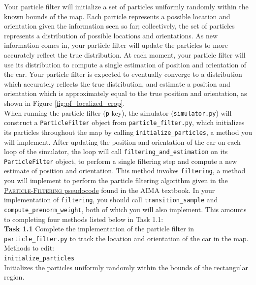 \documentclass[a4paper]{article}
\theoremstyle{definition}
\theoremstyle{plain}
\begin{document}
Your particle filter will initialize a set of particles uniformly randomly within the known bounds of the map. Each particle represents a possible location and orientation given the information seen so far; collectively, the set of particles represents a distribution of possible locations and orientations. As new information comes in, your particle filter will update the particles to more accurately reflect the true distribution. At each moment, your particle filter will use its distribution to compute a single estimation of position and orientation of the car. Your particle filter is expected to eventually converge to a distribution which accurately reflects the true distribution, and estimate a position and orientation which is approximately equal to the true position and orientation, as shown in Figure \ref{fig:pf_localized_crop}.\\

When running the particle filter (\texttt{p} key), the simulator (\texttt{simulator.py}) will construct a \texttt{ParticleFilter} object from \texttt{particle\_filter.py}, which initializes its particles throughout the map by calling \texttt{initialize\_particles}, a method you will implement. After updating the position and orientation of the car on each loop of the simulator, the loop will call \texttt{filtering\_and\_estimation} on its \texttt{ParticleFilter} object, to perform a single filtering step and compute a new estimate of position and orientation. This method invokes \texttt{filtering}, a method you will implement to perform the particle filtering algorithm given in the \href{https://github.com/aimacode/aima-pseudocode/blob/master/md/Particle-Filtering.md}{\textsc{Particle-Filtering} pseudocode} found in the AIMA textbook. In your implementation of \texttt{filtering}, you should call \texttt{transition\_sample} and \texttt{compute\_prenorm\_weight}, both of which you will also implement. This amounts to completing four methods listed below in Task 1.1:\\

\noindent
\textbf{Task 1.1} Complete the implementation of the particle filter in \texttt{particle\_filter.py} to track the location and orientation of the car in the map. Methods to edit:\\

\indent \texttt{initialize\_particles}\\
\indent Initializes the particles uniformly randomly within the bounds of the rectangular region.\\
\end{document}
